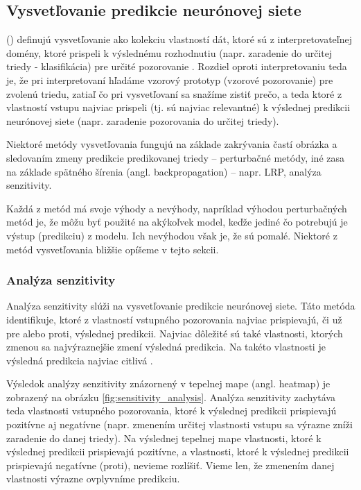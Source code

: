
\subsection{Vysvetľovanie predikcie neurónovej siete}

\citeauthor{montavon2018methods} (\citeyear{montavon2018methods}) definujú vysvetľovanie ako kolekciu vlastností dát, ktoré sú z interpretovateľnej domény, ktoré prispeli k výslednému rozhodnutiu (napr. zaradenie do určitej triedy - klasifikácia) pre určité pozorovanie \cite{montavon2018methods}. Rozdiel oproti interpretovaniu teda je, že pri interpretovaní hľadáme vzorový prototyp (vzorové pozorovanie) pre zvolenú triedu, zatiaľ čo pri vysvetľovaní sa snažíme zistiť prečo, a teda ktoré z vlastností vstupu najviac prispeli (tj. sú najviac relevantné) k výslednej predikcii neurónovej siete (napr. zaradenie pozorovania do určitej triedy). 

Niektoré metódy vysvetľovania fungujú na základe zakrývania častí obrázka a sledovaním zmeny predikcie predikovanej triedy -- perturbačné metódy, iné zasa na základe spätného šírenia (angl. backpropagation) -- napr. LRP, analýza senzitivity.

Každá z metód má svoje výhody a nevýhody, napríklad výhodou perturbačných metód je, že môžu byť použité na akýkoľvek model, keďže jediné čo potrebujú je výstup (predikciu) z modelu. Ich nevýhodou však je, že sú pomalé. Niektoré z metód vysvetľovania bližšie opíšeme v tejto sekcii.

\subsubsection{Analýza senzitivity}

Analýza senzitivity slúži na vysvetľovanie predikcie neurónovej siete. Táto metóda identifikuje, ktoré z vlastností vstupného pozorovania najviac prispievajú, či už pre alebo proti, výslednej predikcii. Najviac dôležité sú také vlastnosti, ktorých zmenou sa najvýraznejšie zmení výsledná predikcia. Na takéto vlastnosti je výsledná predikcia najviac citlivá \cite{montavon2018methods}.

Výsledok analýzy senzitivity znázornený v tepelnej mape (angl. heatmap) je zobrazený na obrázku \ref{fig:sensitivity_analysis}. Analýza senzitivity zachytáva teda vlastnosti vstupného pozorovania, ktoré k výslednej predikcii prispievajú pozitívne aj negatívne (napr. zmenením určitej vlastnosti vstupu sa výrazne zníži zaradenie do danej triedy). Na výslednej tepelnej mape vlastnosti, ktoré k výslednej predikcii prispievajú pozitívne, a vlastnosti, ktoré k výslednej predikcii prispievajú negatívne (proti), nevieme rozlíšiť. Vieme len, že zmenením danej vlastnosti výrazne ovplyvníme predikciu.

